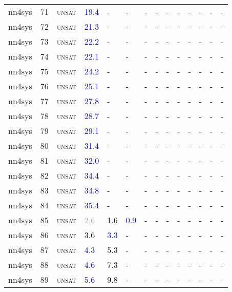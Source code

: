 \begin{center}
{\begin{longtable}{@{}llllllllllllll@{}}
nn4sys & 71 & \textsc{unsat} & \textcolor{blue}{19.4} & - & - & - & - & - & - & - & - & - & - \\
nn4sys & 72 & \textsc{unsat} & \textcolor{blue}{21.3} & - & - & - & - & - & - & - & - & - & - \\
nn4sys & 73 & \textsc{unsat} & \textcolor{blue}{22.2} & - & - & - & - & - & - & - & - & - & - \\
nn4sys & 74 & \textsc{unsat} & \textcolor{blue}{22.1} & - & - & - & - & - & - & - & - & - & - \\
nn4sys & 75 & \textsc{unsat} & \textcolor{blue}{24.2} & - & - & - & - & - & - & - & - & - & - \\
nn4sys & 76 & \textsc{unsat} & \textcolor{blue}{25.1} & - & - & - & - & - & - & - & - & - & - \\
nn4sys & 77 & \textsc{unsat} & \textcolor{blue}{27.8} & - & - & - & - & - & - & - & - & - & - \\
nn4sys & 78 & \textsc{unsat} & \textcolor{blue}{28.7} & - & - & - & - & - & - & - & - & - & - \\
nn4sys & 79 & \textsc{unsat} & \textcolor{blue}{29.1} & - & - & - & - & - & - & - & - & - & - \\
nn4sys & 80 & \textsc{unsat} & \textcolor{blue}{31.4} & - & - & - & - & - & - & - & - & - & - \\
nn4sys & 81 & \textsc{unsat} & \textcolor{blue}{32.0} & - & - & - & - & - & - & - & - & - & - \\
nn4sys & 82 & \textsc{unsat} & \textcolor{blue}{34.4} & - & - & - & - & - & - & - & - & - & - \\
nn4sys & 83 & \textsc{unsat} & \textcolor{blue}{34.8} & - & - & - & - & - & - & - & - & - & - \\
nn4sys & 84 & \textsc{unsat} & \textcolor{blue}{35.4} & - & - & - & - & - & - & - & - & - & - \\
nn4sys & 85 & \textsc{unsat} & \textcolor{darkgray}{2.6} & \textcolor{black}{1.6} & \textcolor{blue}{0.9} & - & - & - & - & - & - & - & - \\
nn4sys & 86 & \textsc{unsat} & \textcolor{black}{3.6} & \textcolor{blue}{3.3} & - & - & - & - & - & - & - & - & - \\
nn4sys & 87 & \textsc{unsat} & \textcolor{blue}{4.3} & \textcolor{black}{5.3} & - & - & - & - & - & - & - & - & - \\
nn4sys & 88 & \textsc{unsat} & \textcolor{blue}{4.6} & \textcolor{black}{7.3} & - & - & - & - & - & - & - & - & - \\
nn4sys & 89 & \textsc{unsat} & \textcolor{blue}{5.6} & \textcolor{black}{9.8} & - & - & - & - & - & - & - & - & - \\

\end{longtable}}
\end{center}

